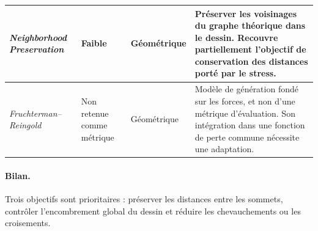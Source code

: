 \documentclass[a4paper,11pt]{article}
\begin{document}
\begin{longtable}{|p{2.5cm}|p{2.3cm}|p{2.7cm}|p{6.5cm}|}
\textit{Neighborhood Preservation} &
Faible &
Géométrique &
Préserver les voisinages du graphe théorique dans le dessin. Recouvre partiellement l'objectif de conservation des distances porté par le stress. \\
\hline

\textit{Fruchterman--Reingold} &
Non retenue comme métrique &
Géométrique &
Modèle de génération fondé sur les forces, et non d'une métrique d'évaluation. Son intégration dans une fonction de perte commune nécessite une adaptation. \\
\hline

\end{longtable}
\normalsize

\paragraph{Bilan.}
Trois objectifs sont prioritaires : préserver les distances entre les sommets, contrôler l'encombrement global du dessin et réduire les chevauchements ou les croisements.

\end{document}
